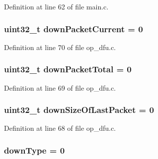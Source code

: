 \-Definition at line 62 of file main.\-c.

\hypertarget{group___pip_xtreme_b_l_ga5125fe846a539f8e8a71d9a21a1b4d4d}{
\subsubsection[{down\-Packet\-Current}]{\setlength{\rightskip}{0pt plus 5cm}uint32\-\_\-t {\bf down\-Packet\-Current} = 0}}\label{group___pip_xtreme_b_l_ga5125fe846a539f8e8a71d9a21a1b4d4d}


\-Definition at line 70 of file op\-\_\-dfu.\-c.

\hypertarget{group___pip_xtreme_b_l_gaa0f5e0ae7b6b9c1c7aa32e606fae3652}{
\subsubsection[{down\-Packet\-Total}]{\setlength{\rightskip}{0pt plus 5cm}uint32\-\_\-t {\bf down\-Packet\-Total} = 0}}\label{group___pip_xtreme_b_l_gaa0f5e0ae7b6b9c1c7aa32e606fae3652}


\-Definition at line 69 of file op\-\_\-dfu.\-c.

\hypertarget{group___pip_xtreme_b_l_ga82229f66c307f3b4e51c7bd613d65eb4}{
\subsubsection[{down\-Size\-Of\-Last\-Packet}]{\setlength{\rightskip}{0pt plus 5cm}uint32\-\_\-t {\bf down\-Size\-Of\-Last\-Packet} = 0}}\label{group___pip_xtreme_b_l_ga82229f66c307f3b4e51c7bd613d65eb4}


\-Definition at line 68 of file op\-\_\-dfu.\-c.

\hypertarget{group___pip_xtreme_b_l_ga51d987c86e99fb64184b4b90a57ff360}{
\subsubsection[{down\-Type}]{ {\bf down\-Type} = 0}}\label{group___pip_xtreme_b_l_ga51d987c86e99fb64184b4b90a57ff360}


